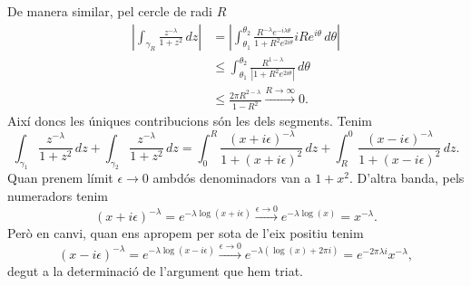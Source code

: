 \documentclass[12pt]{article}
\numberwithin{table}{section}
\numberwithin{figure}{section}
\numberwithin{equation}{section}
\newcommand{\abs}[1]{\left\lvert #1 \right\rvert}
\begin{document}
De manera similar, pel cercle de radi \( R \)
\begin{align*}
	\abs{\int_{\gamma_R} \frac{z^{-\lambda}}{1 + z^2} \, dz} & = \abs{\int_{\theta_1}^{\theta_2} \frac{R^{-\lambda}e^{-i\lambda\theta}}{1 + R^2 e^{2i\theta}} iR e^{i\theta} \, d\theta} \\
																													 & \leq \int_{\theta_1}^{\theta_2} \frac{R^{1 - \lambda}}{\abs{1 + R^2 e^{2i\theta}}} \, d\theta \\
																													 & \leq \frac{2\pi R^{2 - \lambda}}{1 - R^2} \xrightarrow{R \to \infty} 0.
\end{align*}
Així doncs les úniques contribucions són les dels segments. Tenim
\begin{equation*}
	\int_{\gamma_1} \frac{z^{-\lambda}}{1 + z^2} \, dz + \int_{\gamma_2} \frac{z^{-\lambda}}{1 + z^2} \, dz  = \int_0^R \frac{(x + i\epsilon)^{-\lambda}}{1 + (x + i\epsilon)^2} \, dz + \int_R^0 \frac{(x - i\epsilon)^{-\lambda}}{1 + (x - i\epsilon)^2} \, dz.
\end{equation*}
Quan prenem límit \( \epsilon \to 0 \) ambdós denominadors van a \( 1 + x^2 \). D'altra banda, pels numeradors tenim
\begin{equation*}
	(x + i\epsilon)^{-\lambda} = e^{-\lambda \log(x + i\epsilon)} \xrightarrow{\epsilon \to 0} e^{-\lambda \log(x)} = x^{-\lambda}.
\end{equation*}
Però en canvi, quan ens apropem per sota de l'eix positiu tenim
\begin{equation*}
	(x - i\epsilon)^{-\lambda} = e^{-\lambda \log(x - i\epsilon)} \xrightarrow{\epsilon \to 0} e^{-\lambda (\log(x) + 2\pi i)} = e^{-2\pi \lambda i}x^{-\lambda},
\end{equation*}
degut a la determinació de l'argument que hem triat.
\end{document}

